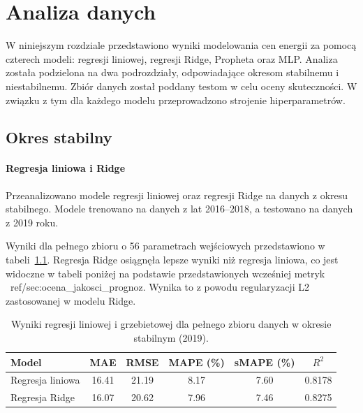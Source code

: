 \chapter{Analiza danych}
\label{ch:analiza}

W niniejszym rozdziale przedstawiono wyniki modelowania cen energii za pomocą czterech modeli: regresji liniowej, regresji Ridge, Propheta oraz MLP. Analiza została podzielona na dwa podrozdziały, odpowiadające okresom stabilnemu i niestabilnemu. Zbiór danych został poddany testom w celu oceny skuteczności. W związku z tym dla każdego modelu przeprowadzono strojenie hiperparametrów. 

\section{Okres stabilny}
\label{sec:okres_stabilny}

\subsubsection{Regresja liniowa i Ridge}

Przeanalizowano modele regresji liniowej oraz regresji Ridge na danych z okresu stabilnego. Modele trenowano na danych z lat 2016--2018, a testowano na danych z 2019 roku.

Wyniki dla pełnego zbioru o 56 parametrach wejściowych przedstawiono w tabeli~\ref{tab:linear_ridge_results_full}. Regresja Ridge osiągnęła lepsze wyniki niż regresja liniowa, co jest widoczne w tabeli poniżej na podstawie przedstawionych wcześniej metryk ~ref/{sec:ocena_jakosci_prognoz}. Wynika to z powodu regularyzacji L2 zastosowanej w modelu Ridge. 

\begin{table}[h]
    \centering
    \caption{Wyniki regresji liniowej i grzebietowej dla pełnego zbioru danych w okresie stabilnym (2019).}
    \label{tab:linear_ridge_results_full}
    \begin{tabular}{|l|ccccc|}
        \hline
        \textbf{Model} & \textbf{MAE} & \textbf{RMSE} & \textbf{MAPE (\%)} & \textbf{sMAPE (\%)} & \textbf{\(R^2\)} \\
        \hline
        Regresja liniowa & 16.41 & 21.19 & 8.17 & 7.60 & 0.8178 \\
        Regresja Ridge   & 16.07 & 20.62 & 7.96 & 7.46 & 0.8275 \\
        \hline
    \end{tabular}
\end{table}

